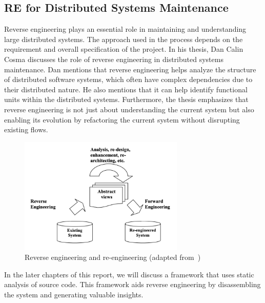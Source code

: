 \subsection{RE for Distributed Systems Maintenance}
Reverse engineering plays an essential role in maintaining and understanding large distributed systems. The approach used in the process depends on the requirement and overall specification of the project. In his thesis, Dan Calin Cosma discusses the role of reverse engineering in distributed systems maintenance\citep{CosmaReOODS}. Dan mentions that reverse engineering helps analyze the structure of distributed software systems, which often have complex dependencies due to their distributed nature. He also mentions that it can help identify functional units within the distributed systems. Furthermore, the thesis emphasizes that reverse engineering is not just about understanding the current system but also enabling its evolution by refactoring the current system without disrupting existing flows.

\begin{figure}[H]
    \centering
    \includegraphics[width=0.7\textwidth]{figures/re_and_reengineering.png}
    \caption{Reverse engineering and re-engineering (adapted from~\cite{SeMaintainance2001})}
    \label{fig:re_and_reengineering}
\end{figure}

In the later chapters of this report, we will discuss a framework that uses static analysis of source code. This framework aids reverse engineering by disassembling the system and generating valuable insights.